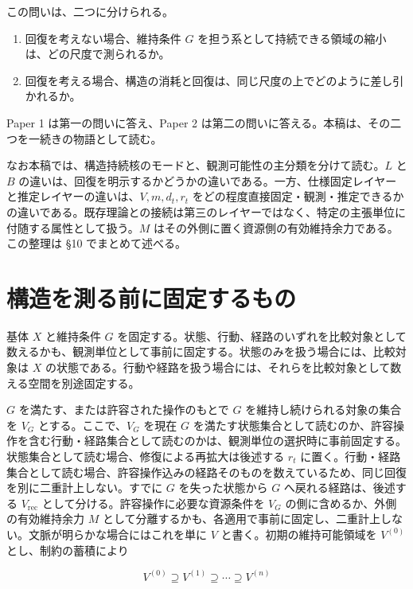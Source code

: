 \documentclass[12pt,a4paper]{article}
\begin{document}
この問いは、二つに分けられる。

\begin{enumerate}
\def\labelenumi{\arabic{enumi}.}
\tightlist
\item
  回復を考えない場合、維持条件 \(G\) を担う系として持続できる領域の縮小は、どの尺度で測られるか。
\item
  回復を考える場合、構造の消耗と回復は、同じ尺度の上でどのように差し引かれるか。
\end{enumerate}

Paper 1 は第一の問いに答え、Paper 2 は第二の問いに答える。本稿は、その二つを一続きの物語として読む。

なお本稿では、構造持続核のモードと、観測可能性の主分類を分けて読む。\(L\) と \(B\) の違いは、回復を明示するかどうかの違いである。一方、仕様固定レイヤーと推定レイヤーの違いは、\(V,m,d_{t},r_{t}\) をどの程度直接固定・観測・推定できるかの違いである。既存理論との接続は第三のレイヤーではなく、特定の主張単位に付随する属性として扱う。\(M\) はその外側に置く資源側の有効維持余力である。この整理は §10 でまとめて述べる。

\section{構造を測る前に固定するもの}\label{ux69cbux9020ux3092ux6e2cux308bux524dux306bux56faux5b9aux3059ux308bux3082ux306e}

基体 \(X\) と維持条件 \(G\) を固定する。状態、行動、経路のいずれを比較対象として数えるかも、観測単位として事前に固定する。状態のみを扱う場合には、比較対象は \(X\) の状態である。行動や経路を扱う場合には、それらを比較対象として数える空間を別途固定する。

\(G\) を満たす、または許容された操作のもとで \(G\) を維持し続けられる対象の集合を \(V_{G}\) とする。ここで、\(V_{G}\) を現在 \(G\) を満たす状態集合として読むのか、許容操作を含む行動・経路集合として読むのかは、観測単位の選択時に事前固定する。状態集合として読む場合、修復による再拡大は後述する \(r_{t}\) に置く。行動・経路集合として読む場合、許容操作込みの経路そのものを数えているため、同じ回復を別に二重計上しない。すでに \(G\) を失った状態から \(G\) へ戻れる経路は、後述する \(V_{\mathrm{rec}}\) として分ける。許容操作に必要な資源条件を \(V_{G}\) の側に含めるか、外側の有効維持余力 \(M\) として分離するかも、各適用で事前に固定し、二重計上しない。文脈が明らかな場合にはこれを単に \(V\) と書く。初期の維持可能領域を \(V^{(0)}\) とし、制約の蓄積により

\[
V^{(0)} \supseteq V^{(1)} \supseteq \cdots \supseteq V^{(n)}
\]
\end{document}
